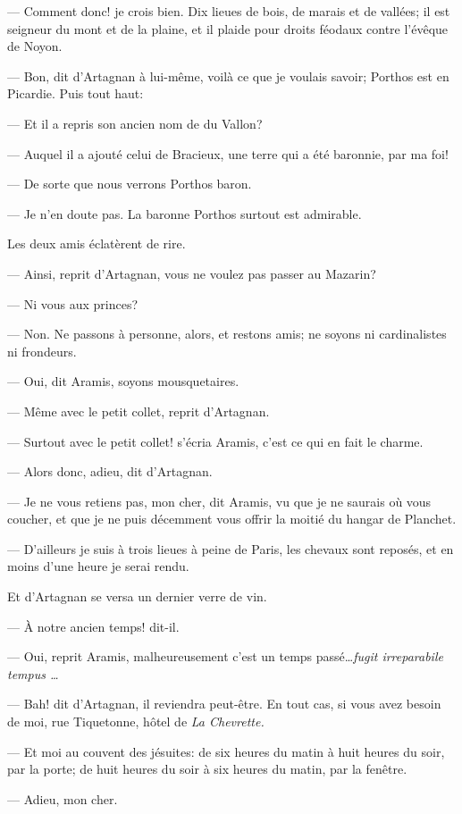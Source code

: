 — Comment donc! je crois bien. Dix lieues de bois, de marais et de vallées; il est seigneur du mont et de la plaine, et il plaide pour droits féodaux contre l'évêque de Noyon.

— Bon, dit d'Artagnan à lui-même, voilà ce que je voulais savoir; Porthos est en Picardie.
Puis tout haut:

— Et il a repris son ancien nom de du Vallon?

— Auquel il a ajouté celui de Bracieux, une terre qui a été baronnie, par ma foi!

— De sorte que nous verrons Porthos baron.

— Je n'en doute pas. La baronne Porthos surtout est admirable.

Les deux amis éclatèrent de rire.

— Ainsi, reprit d'Artagnan, vous ne voulez pas passer au Mazarin?

— Ni vous aux princes?

— Non. Ne passons à personne, alors, et restons amis; ne soyons ni cardinalistes ni frondeurs.

— Oui, dit Aramis, soyons mousquetaires.

— Même avec le petit collet, reprit d'Artagnan.

— Surtout avec le petit collet! s'écria Aramis, c'est ce qui en fait le charme.

— Alors donc, adieu, dit d'Artagnan.

— Je ne vous retiens pas, mon cher, dit Aramis, vu que je ne saurais où vous coucher, et que je ne puis décemment vous offrir la moitié du hangar de Planchet.

— D'ailleurs je suis à trois lieues à peine de Paris, les chevaux sont reposés, et en moins d'une heure je serai rendu.

Et d'Artagnan se versa un dernier verre de vin.

— À notre ancien temps! dit-il.

— Oui, reprit Aramis, malheureusement c'est un temps passé\dots \textit{fugit irreparabile tempus \dots}

— Bah! dit d'Artagnan, il reviendra peut-être. En tout cas, si vous avez besoin de moi, rue Tiquetonne, hôtel de \textit{La Chevrette.}

— Et moi au couvent des jésuites: de six heures du matin à huit heures du soir, par la porte; de huit heures du soir à six heures du matin, par la fenêtre.

— Adieu, mon cher.

